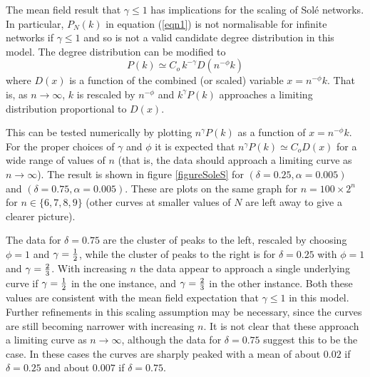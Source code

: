 \documentclass[12pt]{iopart}
\def\sfrac#1#2{\hbox{\normalsize $\frac{#1}{#2}$}}
\def\Ref#1{(\ref{#1})}
\begin{document}
The mean field result that $\gamma \leq 1$ has implications for the scaling of Sol\'e 
networks.  In particular, $P_N(k)$ in equation \Ref{eqn1}  is not
normalisable for infinite networks if $\gamma \leq 1$ and so is not a valid
candidate degree distribution in this model.  
The degree distribution can be modified to
\begin{equation}
P (k) \simeq C_o\, k^{-\gamma} D(n^{-\phi} k)
\label{eqn52}  %
\end{equation}
where $D(x)$ is a function of the combined (or scaled) variable $x=n^{-\phi}k$.  
That is, as $n\to\infty$, $k$ is rescaled by $n^{-\phi}$
and $k^\gamma P(k)$ approaches a limiting distribution proportional to
$D(x)$.  

This can be tested numerically by plotting $n^\gamma P(k)$ as a function 
of $x=n^{-\phi}k$.  For the proper choices of $\gamma$ and $\phi$
it is expected that $n^\gamma P(k) \simeq C_o D(x)$ for a wide range 
of values of $n$ (that is, the data should approach a limiting curve as $n\to\infty$).  
The result is shown in figure \ref{figureSoleS} for $(\delta=0.25,\alpha=0.005)$ 
and $(\delta=0.75,\alpha=0.005)$. These are plots on the same graph for 
$n = 100 \times 2^n$ for $n\in\{6,7,8,9\}$ (other curves at smaller values of $N$
are left away to give a clearer picture).


The data for $\delta=0.75$ are the cluster of peaks to the left, rescaled by
choosing $\phi=1$ and $\gamma=\sfrac{1}{2}$, while the cluster of peaks to the
right is for $\delta=0.25$ with $\phi=1$ and $\gamma=\sfrac{2}{3}$.  With increasing
$n$ the data appear to approach a single underlying curve if $\gamma=\sfrac{1}{2}$ in the
one instance, and $\gamma=\sfrac{2}{3}$ in the other instance.  Both these
values are consistent with the mean field expectation that $\gamma \leq 1$ in
this model.  Further refinements in this scaling assumption may be necessary, since
the curves are still becoming narrower with increasing $n$.  It is not clear that
these approach a limiting curve as $n\to\infty$, although the data for $\delta=0.75$
suggest this to be the case.   In these cases the curves are sharply peaked 
with a mean of about $0.02$ if $\delta=0.25$ and about $0.007$ if $\delta=0.75$.
\end{document}
